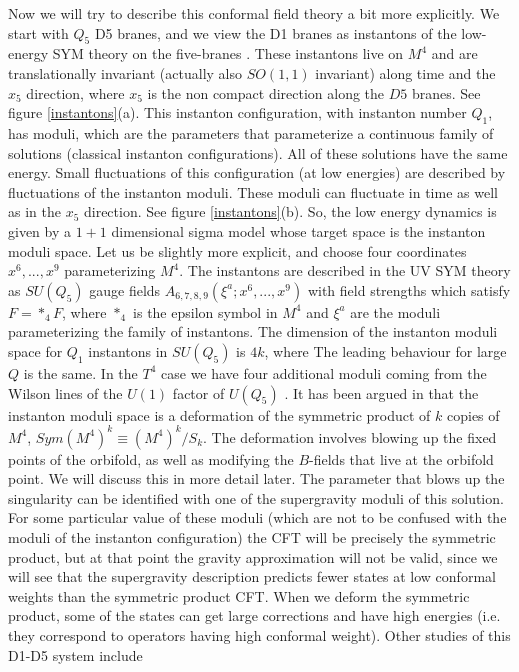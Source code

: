 Now we will try to describe this conformal field theory a bit 
more explicitly. 
We start with $ Q_5$ D5 branes, and we view the D1 branes as
instantons of the low-energy SYM theory
on the five-branes \cite{Douglas:1995bn}. 
These instantons live on $M^4$ and
are translationally invariant (actually also $SO(1,1)$ invariant) along
 time and the $x_5$ direction, where $x_5$ is the non compact direction 
along the 
$D5$ branes.  See figure \ref{instantons}(a).
This instanton configuration, with
instanton number $Q_1$, has  moduli, which are the parameters that 
parameterize a continuous family of solutions (classical instanton
configurations). All of these solutions
have the same energy.
Small fluctuations of this configuration (at low energies)
are described by fluctuations of the  instanton moduli. These moduli
can fluctuate in time as well as in the $x_5$ direction. See figure 
\ref{instantons}(b).
So, the low energy dynamics is given by a $1+1$ dimensional sigma model
whose target space is the instanton moduli space. 
Let us be slightly 
more explicit, and choose four coordinates $x^6,...,x^9$
parameterizing $M^4$. The instantons are described in the UV SYM
theory as $SU(Q_5)$ gauge fields
$A_{6,7,8,9}(\xi^a; x^6,...,x^9)$  with field strengths which 
satisfy $F = *_4 F$, where $*_4$ is the epsilon  symbol in $M^4$ and
 $\xi^a $ are the moduli  parameterizing
the family of instantons.
 The dimension of the instanton moduli space
for $Q_1$ instantons in $SU(Q_5)$   is
$4k$, where
The leading 
behaviour for large $Q$ is the same. In the $T^4$ case we have four
additional moduli coming from the Wilson lines of the $U(1)$ factor
of $U(Q_5)$ \cite{Maldacena:1999bp}. 
It has been argued  in \cite{Vafa:1996bm,Witten:1997yu}
 that the instanton moduli space is 
a deformation of the symmetric product of $k$ copies of $M^4$,
 $Sym(M^4)^k \equiv (M^4)^k/S_k$. The deformation involves blowing up 
the fixed points of the orbifold, as well as modifying the
$B$-fields that live at the orbifold point. We will discuss this 
in more detail later.
The parameter that blows up the singularity can be identified
with one of the supergravity moduli of this solution.
For some particular value of these moduli (which are not to be
confused with the moduli of the instanton configuration)
the CFT will be precisely the
symmetric product, but at that point the gravity approximation will
not be valid, since we will see that the supergravity description
predicts fewer states at low conformal weights than the symmetric
product CFT. When we deform the symmetric product, some of the states 
can get large  corrections and have high energies (i.e. they
correspond to operators 
having high conformal weight). 
Other studies of this D1-D5 system include 
\cite{Costa:1998nq,Hassan:1997ai,Hassan:1997sf}

